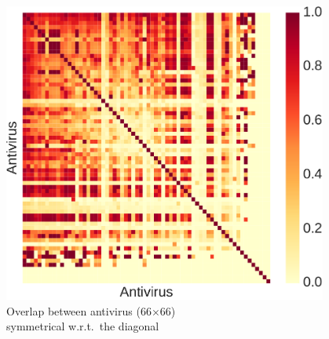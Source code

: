 \begin{frame}
\begin{columns}
        \begin{column}{0.5\textwidth}
            \begin{figure}[!ht]
                \includegraphics[width=0.95\textwidth]{figures/stase/synchronicity.pdf}
                \caption{\scriptsize{
                    Overlap between antivirus (66$\times$66) \\
                    symmetrical w.r.t.~the diagonal
                }}
            \end{figure}
        \end{column}
    \end{columns}

\end{frame}

